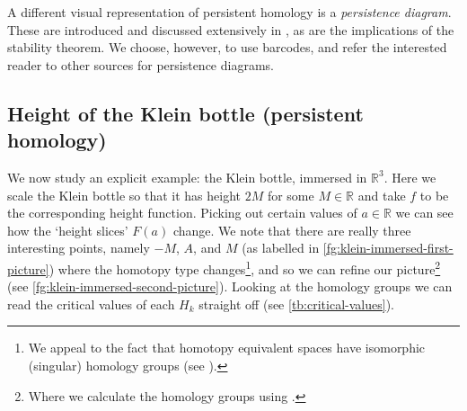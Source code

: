 \documentclass[12pt]{article}
\numberwithin{equation}{subsection}
\numberwithin{theorem}{subsection}
\numberwithin{lemma}{subsection}
\numberwithin{corollary}{subsection}
\numberwithin{definition}{subsection}
\numberwithin{example}{subsection}
\numberwithin{note}{subsection}
\newcommand{\rr}{\mathbb{R}}
\begin{document}
            A different visual representation of persistent homology is a \emph{persistence diagram}.
            These are introduced and discussed extensively in \cite{CohenSteiner:2007is}, as are the implications of the stability theorem.
            We choose, however, to use barcodes, and refer the interested reader to other sources for persistence diagrams.





        \subsection{Height of the Klein bottle (persistent homology)} %
        \label{sub:the_klein_bottle_persistent}

            We now study an explicit example: the Klein bottle, immersed in $\rr^3$.
            Here we scale the Klein bottle so that it has height $2M$ for some $M\in\rr$ and take $f$ to be the corresponding height function.
            Picking out certain values of $a\in\rr$ we can see how the `height slices' $F(a)$ change.
            We note that there are really three interesting points, namely $-M$, $A$, and $M$ (as labelled in \cref{fg:klein-immersed-first-picture}) where the homotopy type changes\footnote{
                We appeal to the fact that homotopy equivalent spaces have isomorphic (singular) homology groups (see \cite[Corollary~2.11,~\S2.1]{hatcher2002algebraic}).
            }, and so we can refine our picture\footnote{
                Where we calculate the homology groups using \cite[Corollary~2.25~\&~Proposition~A.5]{hatcher2002algebraic}.
            } (see \cref{fg:klein-immersed-second-picture}).
            Looking at the homology groups we can read the critical values of each $H_k$ straight off (see \cref{tb:critical-values}).
\end{document}
